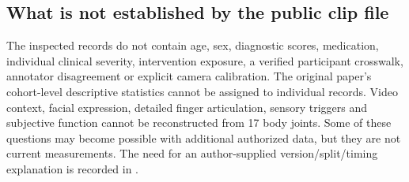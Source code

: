 \subsection{What is not established by the public clip file}
The inspected records do not contain age, sex, diagnostic scores, medication, individual clinical severity, intervention exposure, a verified participant crosswalk, annotator disagreement or explicit camera calibration. The original paper's cohort-level descriptive statistics cannot be assigned to individual records. Video context, facial expression, detailed finger articulation, sensory triggers and subjective function cannot be reconstructed from 17 body joints. Some of these questions may become possible with additional authorized data, but they are not current measurements. The need for an author-supplied version/split/timing explanation is recorded in .
